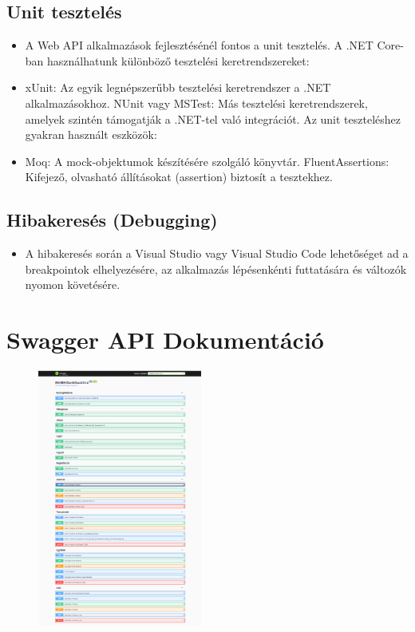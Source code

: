 \documentclass[colorlinks]{thesis-kando}
\theoremstyle{definition}
\theoremstyle{remark}
\begin{document}
\subsection{Unit tesztelés}
\begin{itemize}
    \item A Web API alkalmazások fejlesztésénél fontos a unit tesztelés. A .NET Core-ban használhatunk különböző tesztelési keretrendszereket:
    \item xUnit: Az egyik legnépszerűbb tesztelési keretrendszer a .NET alkalmazásokhoz.
    NUnit vagy MSTest: Más tesztelési keretrendszerek, amelyek szintén támogatják a .NET-tel való integrációt.
    Az unit teszteléshez gyakran használt eszközök:
    
    \item Moq: A mock-objektumok készítésére szolgáló könyvtár.
    FluentAssertions: Kifejező, olvasható állításokat (assertion) biztosít a tesztekhez.
\end{itemize}
\subsection{Hibakeresés (Debugging)}
\begin{itemize}
    \item A hibakeresés során a Visual Studio vagy Visual Studio Code lehetőséget ad a breakpointok elhelyezésére, az alkalmazás lépésenkénti futtatására és változók nyomon követésére.
\end{itemize}

\section{Swagger API Dokumentáció}

\begin{figure} %
    \centering
    \includegraphics[width=0.48\textwidth]{figures/swagger.png} %
    
    \label{fig:example}
\end{figure}
\end{document}
